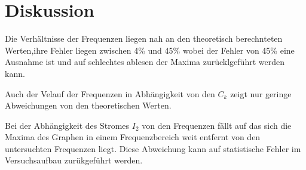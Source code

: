 \newpage
\section{Diskussion}
Die Verhältnisse der Frequenzen liegen nah an den theoretisch berechnteten Werten,ihre Fehler liegen zwischen 4\% und 45\% wobei der Fehler von 45\% eine Ausnahme ist und auf schlechtes ablesen der Maxima zurücklgeführt werden kann.

Auch der Velauf der Frequenzen in Abhängigkeit von den $C_k$ zeigt nur geringe Abweichungen von den theoretischen Werten.

Bei der Abhängigkeit des Stromes $I_2$ von den Frequenzen fällt auf das sich die Maxima des Graphen in einem Frequenzbereich weit entfernt von den untersuchten Frequenzen liegt.
Diese Abweichung kann auf statistische Fehler im Versuchsaufbau zurükgeführt werden.
\label{sec:Diskussion}
